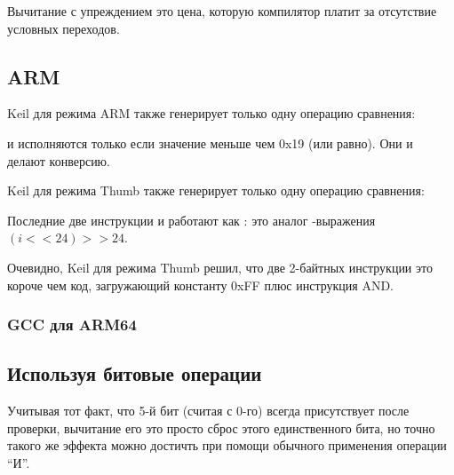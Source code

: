 Вычитание с упреждением это цена, которую компилятор платит за отсутствие условных переходов.

\subsection{ARM}

\Optimizing Keil для режима ARM также генерирует только одну операцию сравнения:




 и  исполняются только если значение  меньше чем 0x19 (или равно).
Они и делают конверсию.

\Optimizing Keil для режима Thumb также генерирует только одну операцию сравнения:




Последние две инструкции  и  работают как :
это аналог \CCpp-выражения $(i<<24)>>24$.

Очевидно, Keil для режима Thumb решил, что две 2-байтных инструкции это короче чем код, загружающий
константу 0xFF плюс инструкция AND.

\subsubsection{GCC для ARM64}





\subsection{Используя битовые операции}
\label{toupper_bit}

Учитывая тот факт, что 5-й бит (считая с 0-го) всегда присутствует после проверки, вычитание его это просто
сброс этого единственного бита, но точно такого же эффекта можно достичть при помощи обычного применения операции
``И''.

